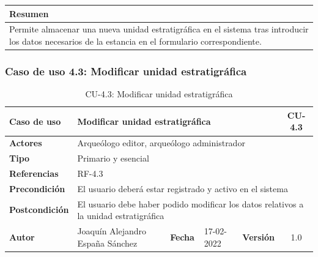     \begin{table}[H]
        \centering
        \begin{tabularx}{\textwidth}{@{} |L |@{}} \hline
            \textbf{Resumen} \\
            \hline
            Permite almacenar una nueva unidad estratigráfica en el sistema tras introducir
            los datos necesarios de la estancia en el formulario correspondiente.\\
            \hline
        \end{tabularx}
    \end{table}

\subsubsection{Caso de uso 4.3: Modificar unidad estratigráfica}

    \begin{table}[H]
    \begin{center}
        \begin{adjustbox}{width=\textwidth}
        \begin{tabular}{ | l | l | l | l | c | c | } 
            \hline
            \textbf{Caso de uso} & \multicolumn{4}{l|}{Modificar unidad estratigráfica} & \cellcolor{gray!50} \textbf{CU-4.3}\\
            \hline
            \textbf{Actores} & \multicolumn{5}{p{0.9\linewidth}|}{Arqueólogo editor, arqueólogo administrador} \\
            \hline
            \textbf{Tipo} & \multicolumn{5}{l|}{Primario y esencial} \\
            \hline
            \textbf{Referencias} & \multicolumn{3}{l|}{RF-4.3} & \multicolumn{2}{l|}{ }\\
            \hline
            \textbf{Precondición} & \multicolumn{5}{l|}{El usuario deberá estar registrado y activo en el sistema} \\
            \hline
            \textbf{Postcondición} & \multicolumn{5}{l|}{El usuario debe haber podido modificar los datos relativos a la
            unidad estratigráfica} \\
            \hline
            \textbf{Autor} & \multicolumn{1}{p{0.25\linewidth}|}{Joaquín Alejandro España Sánchez} & \textbf{Fecha} & 
            17-02-2022     & \textbf{Versión}                                                      & 1.0\\
            \hline
        \end{tabular}
        \end{adjustbox}
        \caption{CU-4.3: Modificar unidad estratigráfica}
        \label{tab:modify-ue}
    \end{center}
    \end{table}

